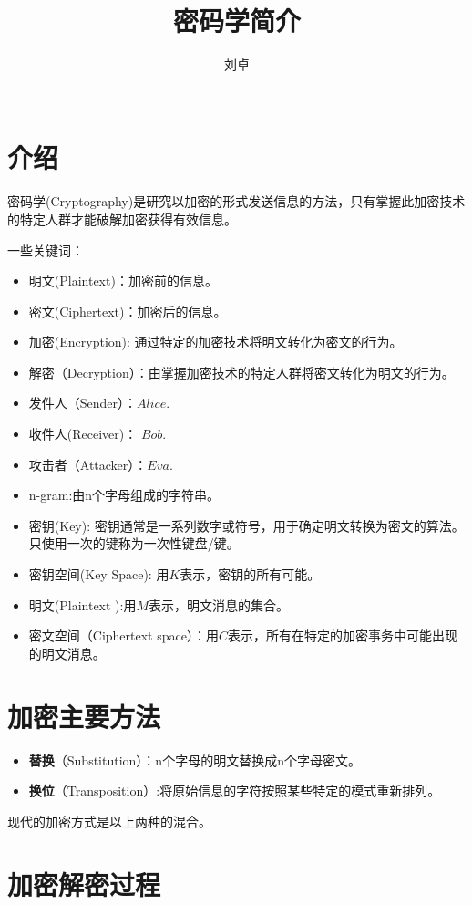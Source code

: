 \documentclass{article}
\date{}
\title{密码学简介}
\author{
 刘卓\\
 \texttt{ } \\
}
\begin{document}
\maketitle

\section{介绍}
密码学(Cryptography)是研究以加密的形式发送信息的方法，只有掌握此加密技术的特定人群才能破解加密获得有效信息。

一些关键词：
\begin{itemize}
\item 明文(Plaintext)：加密前的信息。
\item 密文(Ciphertext)：加密后的信息。
\item 加密(Encryption): 通过特定的加密技术将明文转化为密文的行为。
\item 解密（Decryption）：由掌握加密技术的特定人群将密文转化为明文的行为。
\item 发件人（Sender）：$Alice$.
\item 收件人(Receiver)： $Bob$.
\item 攻击者（Attacker）：$Eva$.
\item n-gram:由n个字母组成的字符串。
\item 密钥(Key): 密钥通常是一系列数字或符号，用于确定明文转换为密文的算法。只使用一次的键称为一次性键盘/键。
\item 密钥空间(Key Space): 用$K$表示，密钥的所有可能。
\item 明文(Plaintext ):用$M$表示，明文消息的集合。
\item 密文空间（Ciphertext space）：用$C$表示，所有在特定的加密事务中可能出现的明文消息。
\end{itemize}

\clearpage

\section{加密主要方法}
\begin{itemize}
\item \textbf{替换}（Substitution）：n个字母的明文替换成n个字母密文。
\item \textbf{换位}（Transposition）:将原始信息的字符按照某些特定的模式重新排列。
\end{itemize}

现代的加密方式是以上两种的混合。

\section{加密解密过程}
\end{document}
